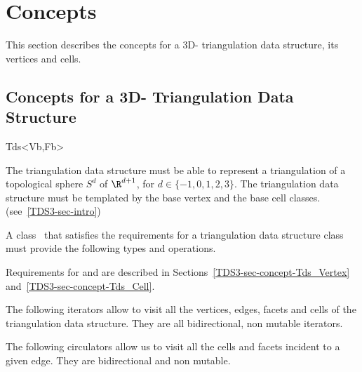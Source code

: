 \clearpage

\section{Concepts}

This section describes the concepts for a 3D- triangulation data
structure, its vertices and cells.

\subsection{Concepts for a 3D- Triangulation Data Structure}
\label{TDS3-sec-concept} 
\begin{ccClassTemplate}{Tds<Vb,Fb>}

The triangulation data structure must be able to represent a
triangulation of a topological sphere $S^d$ of $\R^{d+1}$, for $d \in
\{-1,0,1,2,3\}$.
The triangulation data structure must be templated by the base
vertex and the base cell classes. 
(see~\ref{TDS3-sec-intro})


A class \ccClassTemplateName\ that satisfies the requirements for a
triangulation data structure class must provide the following types and
operations. 

\ccTypes
{}
\ccThreeToTwo

\ccGlue
{}
\ccGlue
{} 
\ccGlue
{}
Requirements for  and  are described in
Sections~\ref{TDS3-sec-concept-Tds_Vertex} and~\ref{TDS3-sec-concept-Tds_Cell}.


The following iterators allow to visit all the vertices, edges, facets
and cells of the triangulation data structure. They are all
bidirectional, non mutable iterators.

\ccGlue
{}
\ccGlue
{}
\ccGlue
{}

The following circulators allow us to visit all the cells and facets
incident to a given edge. They are bidirectional and non mutable.


\end{ccClassTemplate}
